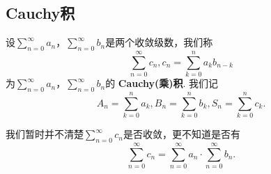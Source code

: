 \documentclass[../../main.tex]{subfiles}
\begin{document}
\subsection{Cauchy积}

\begin{definition}[Cauchy积]\label{definition:Cauchy积}
设\(\sum_{n = 0}^{\infty} a_n\)，\(\sum_{n = 0}^{\infty} b_n\)是两个收敛级数，我们称
\[
\sum_{n = 0}^{\infty} c_n, c_n = \sum_{k = 0}^{n} a_k b_{n - k}
\]
为\(\sum_{n = 0}^{\infty} a_n\)，\(\sum_{n = 0}^{\infty} b_n\)的 \textbf{Cauchy(乘)积}. 我们记
\[
A_n = \sum_{k = 0}^{n} a_k, B_n = \sum_{k = 0}^{n} b_k, S_n = \sum_{k = 0}^{n} c_k.
\]
\end{definition}
\begin{remark}
我们暂时并不清楚\(\sum_{n = 0}^{\infty} c_n\)是否收敛，更不知道是否有
\[
\sum_{n = 0}^{\infty} c_n = \sum_{n = 0}^{\infty} a_n \cdot \sum_{n = 0}^{\infty} b_n. 
\]
\end{remark}
\end{document}
